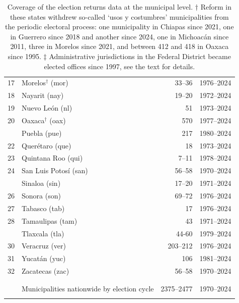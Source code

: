 \documentclass[letter,12pt]{article}
\newcommand{\mc}{\multicolumn}
\begin{document}
\begin{table}
{\begin{tabular}{rlrc}
      17 & Morelos$^\dagger$               (mor)        &     33--36           & 1976--2024 \\
      18 & Nayarit                        (nay)        &     19--20           & 1972--2024 \\
      19 & Nuevo León                     (nl)         &         51           & 1973--2024 \\
      20 & Oaxaca$^\dagger$                (oax)        &        570           & 1977--2024 \\ \hdashline
      21 & Puebla                         (pue)        &        217           & 1980--2024 \\
      22 & Querétaro                      (que)        &         18           & 1973--2024 \\
      23 & Quintana Roo                   (qui)        &      7--11           & 1978--2024 \\
      24 & San Luis Potosí                (san)        &     56--58           & 1970--2024 \\ \hdashline
      25 & Sinaloa                        (sin)        &     17--20           & 1971--2024 \\
      26 & Sonora                         (son)        &     69--72           & 1976--2024 \\
      27 & Tabasco                        (tab)        &         17           & 1976--2024 \\
      28 & Tamaulipas                     (tam)        &         43           & 1971--2024 \\ \hdashline
      29 & Tlaxcala                       (tla)        &      44-60           & 1979--2024 \\
      30 & Veracruz                       (ver)        &   203--212           & 1976--2024 \\
      31 & Yucatán                        (yuc)        &        106           & 1981--2024 \\
      32 & Zacatecas                      (zac)        &     56--58           & 1970--2024 \\
      \\ [-1.8ex] \hline
      \\ [-1.8ex] 
         & \mc{1}{l}{Municipalities nationwide by election cycle} & 2375--2477 & 1970--2024 \\
      \\ [-1.8ex] \hline

    \end{tabular}
}
\caption{Coverage of the election returns data at the municipal level. $\dagger$  Reform in these states withdrew so-called `usos y costumbres' municipalities from the periodic electoral process: one municipality in Chiapas since 2021, one in Guerrero since 2018 and another since 2024, one in Michoacán since 2011, three in Morelos since 2021, and between 412 and 418 in Oaxaca since 1995. $\ddagger$ Administrative jurisdictions in the Federal District became elected offices since 1997, see the text for details.}\label{T:coverage}
\end{table}
\end{document}
